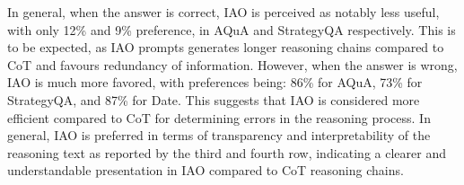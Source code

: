 In general, when the answer is correct, IAO is perceived as notably less useful, with only 12\% and 9\% preference, in AQuA and StrategyQA respectively. This is to be expected, as IAO prompts generates longer reasoning chains compared to CoT and favours redundancy of information. However, when the answer is wrong, IAO is much more favored, with preferences being: 86\% for AQuA, 73\% for StrategyQA, and 87\% for Date. This suggests that IAO is considered more efficient compared to CoT for determining errors in the reasoning process.
In general, IAO is preferred in terms of transparency and interpretability of the reasoning text as reported by the third and fourth row, indicating a clearer and understandable presentation in IAO compared to CoT reasoning chains. 